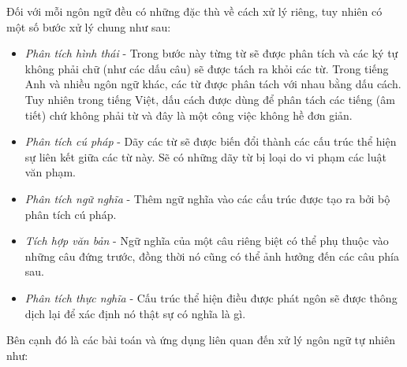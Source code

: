 \documentclass[12pt]{report}
\begin{document}
Đối với mỗi ngôn ngữ đều có những đặc thù về cách xử lý riêng, tuy nhiên có một số bước xử lý chung như sau:

\begin{itemize}
	\item \textit{Phân tích hình thái} - Trong bước này từng từ sẽ được phân tích và các ký tự không phải chữ (như các dấu câu) sẽ được tách ra khỏi các từ. Trong tiếng Anh và nhiều ngôn ngữ khác, các từ được phân tách với nhau bằng dấu cách. Tuy nhiên trong tiếng Việt, dấu cách được dùng để phân tách các tiếng (âm tiết) chứ không phải từ và đây là một công việc không hề đơn giản.
	\item \textit{Phân tích cú pháp} - Dãy các từ sẽ được biến đổi thành các cấu trúc thể hiện sự liên kết giữa các từ này. Sẽ có những dãy từ bị loại do vi phạm các luật văn phạm.
	\item \textit{Phân tích ngữ nghĩa} - Thêm ngữ nghĩa vào các cấu trúc được tạo ra bởi bộ phân tích cú pháp.
	\item \textit{Tích hợp văn bản} - Ngữ nghĩa của một câu riêng biệt có thể phụ thuộc vào những câu đứng trước, đồng thời nó cũng có thể ảnh hưởng đến các câu phía sau.
	\item \textit{Phân tích thực nghĩa} - Cấu trúc thể hiện điều được phát ngôn sẽ được thông dịch lại để xác định nó thật sự có nghĩa là gì.
\end{itemize}

Bên cạnh đó là các bài toán và ứng dụng liên quan đến xử lý ngôn ngữ tự nhiên như:
\end{document}
